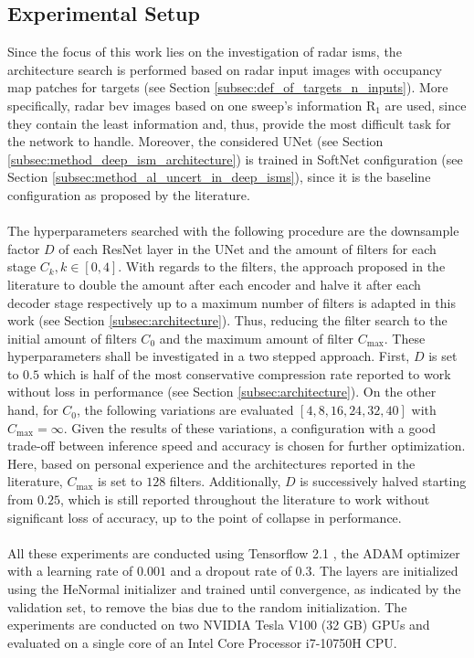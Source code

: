 \subsection{Experimental Setup}
\label{subsec:exp_setup_unet_arch}
Since the focus of this work lies on the investigation of radar \gls{ism}s, the architecture search is performed based on radar input images with occupancy map patches for targets (see Section \ref{subsec:def_of_targets_n_inputs}). More specifically, radar \gls{bev} images based on one sweep's information R$_{1}$ are used, since they contain the least information and, thus, provide the most difficult task for the network to handle. Moreover, the considered UNet (see Section \ref{subsec:method_deep_ism_architecture}) is trained in SoftNet configuration (see Section \ref{subsec:method_al_uncert_in_deep_isms}), since it is the baseline configuration as proposed by the literature.
\\\\
The hyperparameters searched with the following procedure are the downsample factor $D$ of each ResNet layer in the UNet and the amount of filters for each stage $C_k, k \in [0,4]$. With regards to the filters, the approach proposed in the literature to double the amount after each encoder and halve it after each decoder stage respectively up to a maximum number of filters is adapted in this work (see Section \ref{subsec:architecture}). Thus, reducing the filter search to the initial amount of filters $C_0$ and the maximum amount of filter $C_{\max}$. These hyperparameters shall be investigated in a two stepped approach. First, $D$ is set to $0.5$ which is half of the most conservative compression rate reported to work without loss in performance (see Section \ref{subsec:architecture}). On the other hand, for $C_0$, the following variations are evaluated $[4,8,16,24,32,40]$ with $C_{\max} = \infty$. Given the results of these variations, a configuration with a good trade-off between inference speed and accuracy is chosen for further optimization. Here, based on personal experience and the architectures reported in the literature, $C_{\max}$ is set to $128$ filters. Additionally, $D$ is successively halved starting from $0.25$, which is still reported throughout the literature to work without significant loss of accuracy, up to the point of collapse in performance.
\\\\
All these experiments are conducted using Tensorflow 2.1 \cite{abadi2016tensorflow}, the ADAM optimizer \cite{kingma2014adam} with a learning rate of $0.001$ and a dropout rate of $0.3$. The layers are initialized using the HeNormal initializer \cite{he2015delving} and trained until convergence, as indicated by the validation set, to remove the bias due to the random initialization. The experiments are conducted on two NVIDIA Tesla V100 (32 GB) GPUs and evaluated on a single core of an Intel Core Processor i7-10750H CPU.
%
